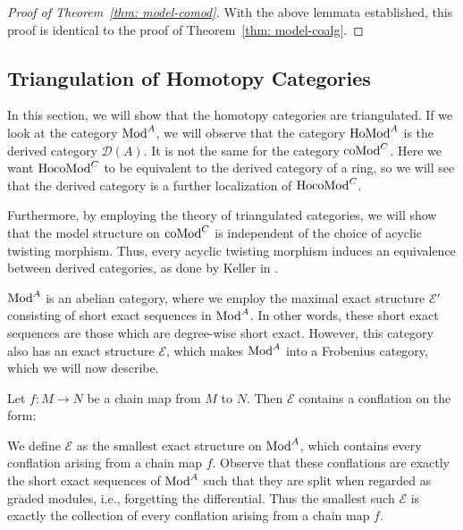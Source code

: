 \documentclass[../thesis.tex]{subfiles}
\begin{document}
            \begin{proof}[Proof of Theorem~\ref{thm: model-comod}]
                With the above lemmata established, this proof is identical to the proof of Theorem~\ref{thm: model-coalg}.
            \end{proof}

        \subsection{Triangulation of Homotopy Categories}
            In this section, we will show that the homotopy categories are triangulated. If we look at the category $\tt{Mod}^A$, we will observe that the category $\tt{Ho} \tt{Mod}^A$ is the derived category $\mathcal{D}(A)$. It is not the same for the category $\tt{coMod}^C$. Here we want $\tt{Ho} \tt{coMod}^C$ to be equivalent to the derived category of a ring, so we will see that the derived category is a further localization of $\tt{Ho} \tt{coMod}^C$.

            Furthermore, by employing the theory of triangulated categories, we will show that the model structure on $\tt{coMod}^C$ is independent of the choice of acyclic twisting morphism. Thus, every acyclic twisting morphism induces an equivalence between derived categories, as done by Keller in \cite{Keller94}.

            $\tt{Mod}^A$ is an abelian category, where we employ the maximal exact structure $\mathcal{E}'$ consisting of short exact sequences in $\tt{Mod}^A$. In other words, these short exact sequences are those which are degree-wise short exact. However, this category also has an exact structure $\mathcal{E}$, which makes $\tt{Mod}^A$ into a Frobenius category, which we will now describe.

            Let $f: M \rightarrow N$ be a chain map from $M$ to $N$. Then $\mathcal{E}$ contains a conflation on the form:
            \begin{center}
            \end{center}
            We define $\mathcal{E}$ as the smallest exact structure on $\tt{Mod}^A$, which contains every conflation arising from a chain map $f$. Observe that these conflations are exactly the short exact sequences of $\tt{Mod}^A$ such that they are split when regarded as graded modules, i.e., forgetting the differential. Thus the smallest such $\mathcal{E}$ is exactly the collection of every conflation arising from a chain map $f$.
\end{document}
